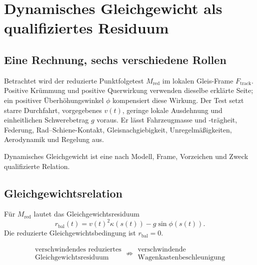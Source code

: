 \chapter{Dynamisches Gleichgewicht als qualifiziertes Residuum}
\label{chap:dynamic-balance}

\section*{Eine Rechnung, sechs verschiedene Rollen}

Betrachtet wird der reduzierte Punktfolgetest \(M_{\mathrm{red}}\) im lokalen
Gleis-Frame \(F_{\mathrm{track}}\). Positive Krümmung und positive Querwirkung
verwenden dieselbe erklärte Seite; ein positiver Überhöhungswinkel \(\phi\)
kompensiert diese Wirkung. Der Test setzt starre Durchfahrt, vorgegebenes
\(v(t)\), geringe lokale Ausdehnung und einheitlichen Schwerebetrag \(g\)
voraus. Er lässt Fahrzeugmasse und -trägheit, Federung, Rad--Schiene-Kontakt,
Gleisnachgiebigkeit, Unregelmäßigkeiten, Aerodynamik und Regelung aus.

\begin{principle}
\label{princ:dynamic-balance}
Dynamisches Gleichgewicht ist eine nach Modell, Frame, Vorzeichen und Zweck
qualifizierte Relation.
\end{principle}

\section{Gleichgewichtsrelation}

\begin{definition}[Gleichgewichtsrelation]
\label{def:balance-relation}
Für \(M_{\mathrm{red}}\) lautet das Gleichgewichtsresiduum
\[
r_{\mathrm{bal}}(t)
=v(t)^2\kappa(s(t))-g\sin\phi(s(t)).
\]
Die reduzierte Gleichgewichtsbedingung ist \(r_{\mathrm{bal}}=0\).
\end{definition}

\[
\boxed{\begin{gathered}
\text{verschwindendes reduziertes}\\
\text{Gleichgewichtsresiduum}
\end{gathered}}
\not\Rightarrow
\boxed{\begin{gathered}
\text{verschwindende}\\
\text{Wagenkastenbeschleunigung}
\end{gathered}}
\]


